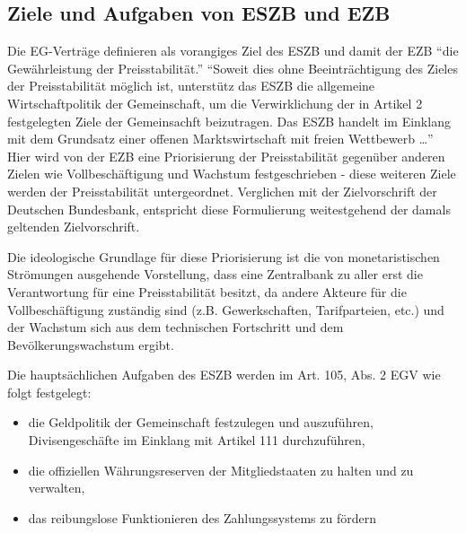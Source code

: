 \documentclass[
      onecolumn,
      a4paper,
      abstracton,
      parskip=half
      ,final
      ]{scrartcl}
\begin{document}
\subsection{}





\subsection{Ziele und Aufgaben von \ac{ESZB} und \ac{EZB}}
Die EG-Vertr{\"a}ge definieren als vorangiges Ziel des \ac{ESZB} und damit der \ac{EZB} "`die Gew{\"a}hrleistung der Preisstabilit{\"a}t."'
"`Soweit dies ohne Beeintr{\"a}chtigung des Zieles der Preisstabilit{\"a}t m{\"o}glich ist, unterst{\"u}tz das \ac{ESZB} die allgemeine Wirtschaftpolitik der Gemeinschaft, um die Verwirklichung der in Artikel 2 festgelegten Ziele der Gemeinsachft beizutragen. Das \ac{ESZB} handelt im Einklang mit dem Grundsatz einer offenen Marktswirtschaft mit freien Wettbewerb \ldots"'\citep[vgl.][S.554]{Basseler2010}
Hier wird von der \ac{EZB} eine Priorisierung der Preisstabilit{\"a}t gegen{\"u}ber anderen Zielen wie Vollbesch{\"a}ftigung und Wachstum festgeschrieben - diese weiteren Ziele werden der Preisstabilit{\"a}t untergeordnet. Verglichen mit der Zielvorschrift der Deutschen Bundesbank, entspricht diese Formulierung weitestgehend der damals geltenden Zielvorschrift.\citep[vgl.][S.554]{Basseler2010}

Die ideologische Grundlage f{\"u}r diese Priorisierung ist die von monetaristischen Str{\"o}mungen ausgehende Vorstellung, dass eine Zentralbank zu aller erst die Verantwortung f{\"u}r eine Preisstabilit{\"a}t besitzt, da andere Akteure f{\"u}r die Vollbesch{\"a}ftigung zust{\"a}ndig sind (z.B. Gewerkschaften, Tarifparteien, etc.) und der Wachstum sich aus dem technischen Fortschritt und dem Bev{\"o}lkerungswachstum ergibt.

Die haupts{\"a}chlichen Aufgaben des \ac{ESZB} werden im Art. 105, Abs. 2 \ac{EGV} wie folgt festgelegt:
\begin{itemize}
    \item{die Geldpolitik der Gemeinschaft festzulegen und auszuf{\"u}hren, Divisengesch{\"a}fte im Einklang mit Artikel 111 durchzuf{\"u}hren,}
    \item{die offiziellen W{\"a}hrungsreserven der Mitgliedstaaten zu halten und zu verwalten,}
    \item{das reibungslose Funktionieren des Zahlungssystems zu f{\"o}rdern}
\end{itemize}
\end{document}
